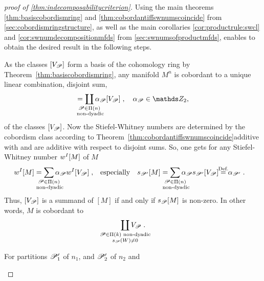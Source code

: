 \begin{proof}[proof of \autoref{thm:indecomposabilitycriterion}]
  Using the main theorems \autoref{thm:basiscobordismring} and
  \autoref{thm:cobordantiffswnumscoincide} from
  \autoref{sec:cobordismringstructure}, as well as the main
  corollaries \autoref{cor:productrule:swcl} and
  \autoref{cor:swnumdecompositionmfds} from
  \autoref{sec:swnumsofproductmfds}, enables to obtain the
  desired result in the following steps.
  \begin{steps}
  \item\label{item:manifoldbasisrepr}
    As the classes $[V_{\mathscr{P}}]$ form a basis of the cohomology ring by
    Theorem~\autoref{thm:basiscobordismring}, any manifold $M^n$ is
    cobordant to a unique linear combination, \idest disjoint sum,
    \begin{gather*}
      [M] = \coprod_{\mathclap{\substack{
            \Part\in\PartitionsOf n \\\text{ non-dyadic}
        }}} \alpha_\Part [V_\Part]
        \;,\quad
        \alpha_\Part \in \Zmod2,
    \end{gather*}
    of the classes $[V_{\mathscr{P}}]$.
    Now the Stiefel-Whitney numbers are determined by the cobordism
    class according to Theorem~\autoref{thm:cobordantiffswnumscoincide}additive with
    and are additive with respect to disjoint sums.
    So, one gets for any Stiefel-Whitney number $w^{I}[M]$ of $M$
    \begin{align*}
      \wsnum{I}{M}
      &= \sum_{\mathclap{\substack{
        \Part\in\PartitionsOf n \\\text{ non-dyadic}
      }}} \alpha_\Part \wsnum{I}{V_\Part}
      \;,
      &\text{especially}
      &&\snum{\Part'}{M}
      &= \sum_{\mathclap{\substack{
        \Part\in\PartitionsOf n \\\text{ non-dyadic}
      }}} \alpha_\Part \snum{\Part'}{V_\Part}
      \cequalsby{Def.} \alpha_{\Part'}
      \;.
    \end{align*}
    Thus, $[V_{\mathscr{P}}]$ is a summand of $[M]$ if and only if
    $s_{\mathscr{P}}[M]$ is non-zero. In other words, $M$ is cobordant to
    \begin{gather*}
      \coprod_{\mathclap{\substack{
            \Part\in\PartitionsOf k \text{ non-dyadic}\\
            \s{\Part}(W)\neq 0
          }}} V_\Part
      \;.
    \end{gather*}
  \item\label{item:productpartitions}
    For partitions $\mathscr{P}_1'$ of $n_1$, and $\mathscr{P}_2'$ of $n_2$ and

\end{steps}
\end{proof}

